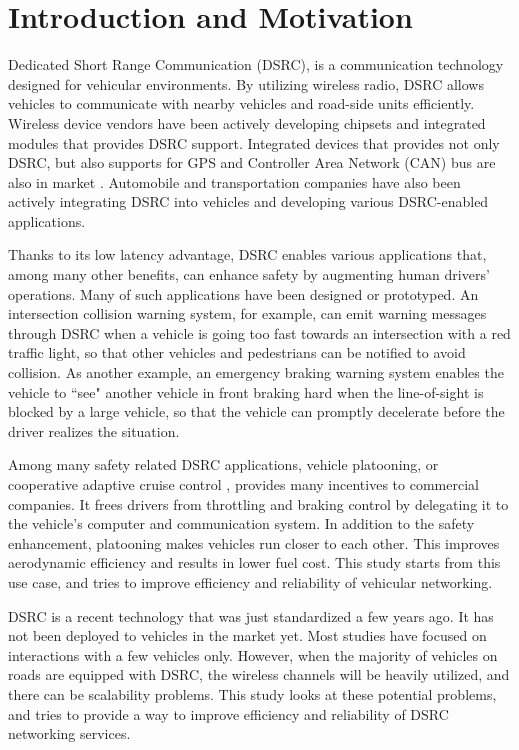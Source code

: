 \documentclass[12pt]{report}
\begin{document}
\normalem       %

\chapter{Introduction and Motivation}
Dedicated Short Range Communication (DSRC), is a communication technology designed for vehicular environments. By utilizing wireless radio, DSRC allows vehicles to communicate with nearby vehicles and road-side units efficiently. Wireless device vendors have been actively developing chipsets and integrated modules that provides DSRC support. Integrated devices that provides not only DSRC, but also supports for GPS and Controller Area Network (CAN) bus are also in market \cite{aradasystems,denso,unex}. Automobile and transportation companies have also been actively integrating DSRC into vehicles and developing various DSRC-enabled applications.

Thanks to its low latency advantage, DSRC enables various applications that, among many other benefits, can enhance safety by augmenting human drivers' operations. Many of such applications have been designed or prototyped. An intersection collision warning system, for example, can emit warning messages through DSRC when a vehicle is going too fast towards an intersection with a red traffic light, so that other vehicles and pedestrians can be notified to avoid collision. As another example, an emergency braking warning system enables the vehicle to ``see" another vehicle in front braking hard when the line-of-sight is blocked by a large vehicle, so that the vehicle can promptly decelerate before the driver realizes the situation.

Among many safety related DSRC applications, vehicle platooning, or cooperative adaptive cruise control \cite{fhwa2015report}, provides many incentives to commercial companies. It frees drivers from throttling and braking control by delegating it to the vehicle's computer and communication system. In addition to the safety enhancement, platooning makes vehicles run closer to each other. This improves aerodynamic efficiency and results in lower fuel cost. This study starts from this use case, and tries to improve efficiency and reliability of vehicular networking.

DSRC is a recent technology that was just standardized a few years ago. It has not been deployed to vehicles in the market yet. Most studies have focused on interactions with a few vehicles only. However, when the majority of vehicles on roads are equipped with DSRC, the wireless channels will be heavily utilized, and there can be scalability problems. This study looks at these potential problems, and tries to provide a way to improve efficiency and reliability of DSRC networking services.
\end{document}
